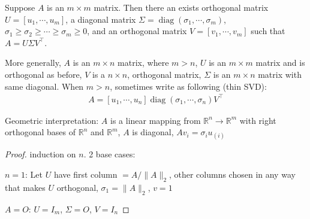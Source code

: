 \documentclass[11pt]{article}
\numberwithin{equation}{section}
\begin{document}
\begin{theorem}
    Suppose $A$ is an $ m \times m$ matrix. Then there an exists orthogonal matrix $U=\left[u_1, \cdots, u_m\right]$, 
    a diagonal matrix $\Sigma=\operatorname{diag}\left(\sigma_1, \cdots, \sigma_m\right)$, $\sigma_1 \geq \sigma_2 \geq \cdots \geq \sigma_m \geq 0$,
    and an orthogonal matrix $V=\left[v_1, \cdots, v_m\right]$ such that $A=U\Sigma V^\top$.

    More generally, $A$ is an $ m \times n$ matrix, where $m>n$, $U$ is an $ m \times m$ matrix and is orthogonal as before, $V$ is a $ n \times n$, orthogonal matrix,
    $\Sigma$ is an $ m \times n$ matrix with same diagonal. When $m>n$, sometimes write as following (thin SVD): \begin{align*}
        A = \left[ u_1, \cdots, u_n \right] \operatorname{diag}\left(\sigma_1, \cdots, \sigma_n\right) V^\top
    \end{align*}

    Geometric interpretation: $A$ is a linear mapping from $\mathbb{R}^n\rightarrow \mathbb{R}^m$ with right orthogonal bases of $\mathbb{R}^n$ and $\mathbb{R}^m$, $A$ is diagonal, $Av_i=\sigma_{i} u_(i)$
    \begin{proof}
        induction on $n$. 2 base cases:

        $n=1$: Let $U$ have first column $=A/\|A\|_2$, other columns chosen in any way that makes $U$ orthogonal, $\sigma_1=\|A\|_2$, $v=1$

        $A=O$: $U=I_{m}$, $\Sigma=O$, $V=I_{n}$


\end{proof}
\end{theorem}
\end{document}
